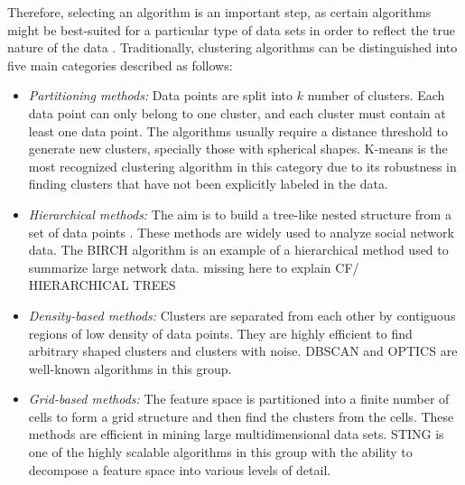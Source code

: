\documentclass[../UNBThesis2.tex]{subfiles}
\begin{document}
Therefore, selecting an algorithm is an important step, as certain algorithms might be best-suited for a particular type of data sets in order to reflect the true nature of the data \cite{berkhin2006survey, han2011data}. Traditionally, clustering algorithms can be distinguished into five main categories described as follows: 


\begin{itemize}

    \item\textit{Partitioning methods:} Data points are split into $k$ number of clusters. Each data point can only belong to one cluster, and each cluster must contain at least one data point. The algorithms usually require a distance threshold %
    to generate new clusters, specially those with spherical shapes.   %
    K-means is the most recognized clustering algorithm in this category due to its robustness in finding clusters that have not been explicitly labeled in the data.
    
    \item\textit{Hierarchical methods:} The aim is to build a tree-like nested structure from a set of data points \cite{swarndeep2016overview}.  These methods are widely used to analyze social network data. The BIRCH algorithm is an example of a hierarchical method used to summarize large network data. missing here to explain CF/ HIERARCHICAL TREES 
    
    
    \item\textit{Density-based methods:} Clusters are separated from each other by contiguous regions of low density of data points. They are highly efficient to find arbitrary shaped clusters and clusters with noise.  DBSCAN and OPTICS are well-known algorithms in this group.
    
    
    \item\textit{Grid-based methods:} %
    The feature space is partitioned into a finite number of cells to form a grid structure and then find the clusters from the cells. These methods are efficient in mining large multidimensional data sets. STING is one of the highly scalable algorithms in this group with the ability to decompose a feature space into various levels of detail. 
   

\end{itemize}
\end{document}
